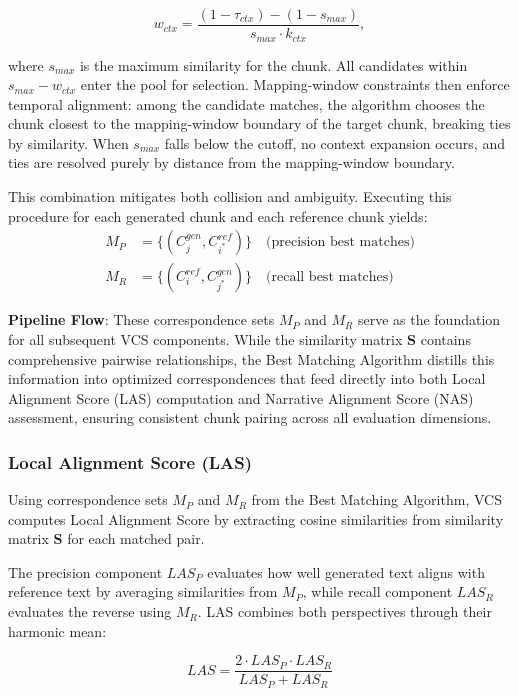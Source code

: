 \documentclass[main.tex]{subfiles}
\begin{document}
\begin{equation}
w_{ctx} = \frac{(1-\tau_{ctx})-(1-s_{max})}{s_{max} \cdot k_{ctx}},
\end{equation}

where $s_{max}$ is the maximum similarity for the chunk. All candidates within $s_{max} - w_{ctx}$ enter the pool for selection. Mapping-window constraints then enforce temporal alignment: among the candidate matches, the algorithm chooses the chunk closest to the mapping-window boundary of the target chunk, breaking ties by similarity. When $s_{max}$ falls below the cutoff, no context expansion occurs, and ties are resolved purely by distance from the mapping-window boundary.

This combination mitigates both collision and ambiguity. Executing this procedure for each generated chunk and each reference chunk yields:
\begin{align}
M_P &= \{(C_j^{gen}, C_{i^*}^{ref})\} \quad \text{(precision best matches)} \\
M_R &= \{(C_i^{ref}, C_{j^*}^{gen})\} \quad \text{(recall best matches)}
\end{align}

\textbf{Pipeline Flow}: These correspondence sets $M_P$ and $M_R$ serve as the foundation for all subsequent VCS components. While the similarity matrix $\mathbf{S}$ contains comprehensive pairwise relationships, the Best Matching Algorithm distills this information into optimized correspondences that feed directly into both Local Alignment Score (LAS) computation and Narrative Alignment Score (NAS) assessment, ensuring consistent chunk pairing across all evaluation dimensions.

\subsubsection{Local Alignment Score (LAS)}
Using correspondence sets $M_P$ and $M_R$ from the Best Matching Algorithm, VCS computes Local Alignment Score by extracting cosine similarities from similarity matrix $\mathbf{S}$ for each matched pair.

The precision component $LAS_P$ evaluates how well generated text aligns with reference text by averaging similarities from $M_P$, while recall component $LAS_R$ evaluates the reverse using $M_R$. LAS combines both perspectives through their harmonic mean:

\begin{equation}
LAS = \frac{2 \cdot LAS_P \cdot LAS_R}{LAS_P + LAS_R}
\end{equation}
\end{document}
